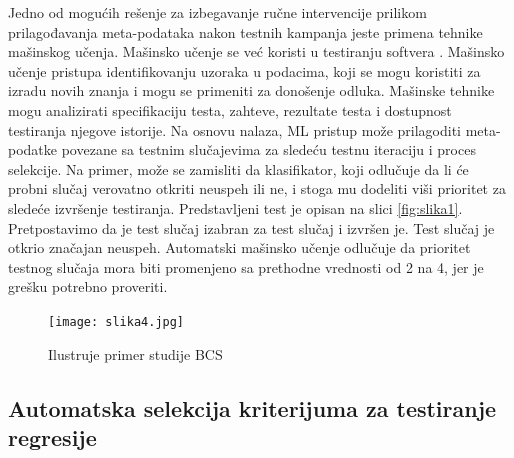 \documentclass[a4paper]{article}
\begin{document}
Jedno od mogućih rešenje za izbegavanje ručne intervencije prilikom prilagođavanja meta-podataka nakon testnih kampanja jeste primena tehnike mašinskog učenja. Mašinsko učenje se već koristi u testiranju softvera \cite{ref26}\cite{ref27}. Mašinsko učenje pristupa identifikovanju uzoraka u podacima, koji se mogu koristiti za izradu novih znanja i mogu se primeniti za donošenje odluka. Mašinske tehnike mogu analizirati specifikaciju testa, zahteve, rezultate testa i dostupnost testiranja njegove istorije. Na osnovu nalaza, ML pristup može prilagoditi meta-podatke povezane sa testnim slučajevima za sledeću testnu iteraciju i proces selekcije. Na primer, može se zamisliti da klasifikator, koji odlučuje da li će probni slučaj verovatno otkriti neuspeh ili ne, i stoga mu dodeliti viši prioritet za sledeće izvršenje testiranja.
\bigbreak
Predstavljeni test je opisan na slici \ref{fig:slika1}. Pretpostavimo da je test slučaj izabran za test slučaj i izvršen je. Test slučaj je otkrio značajan neuspeh. Automatski mašinsko učenje odlučuje da prioritet testnog slučaja mora biti promenjeno sa prethodne vrednosti od 2 na 4, jer je grešku potrebno proveriti.
\bigbreak

\begin{figure}[h!]
\begin{center}
\texttt{[image: slika4.jpg]}
\end{center}
\caption{Ilustruje primer studije BCS}
\label{fig:slika4}
\end{figure}
\bigbreak

\subsection{Automatska selekcija kriterijuma za testiranje regresije}
\label{subsec:automatskaselekcija}
\end{document}
